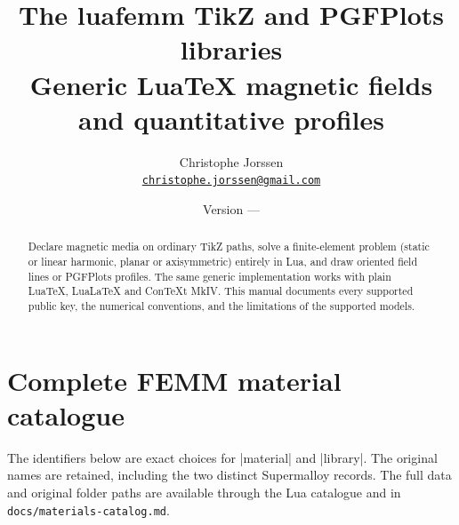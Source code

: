 \documentclass[a4paper,11pt]{ltxdoc}
\title{The \textsf{luafemm} TikZ and PGFPlots libraries\\
  \large Generic LuaTeX magnetic fields and quantitative profiles}
\author{Christophe Jorssen\\
  \normalsize\href{mailto:christophe.jorssen@gmail.com}{\nolinkurl{christophe.jorssen@gmail.com}}}
\date{Version \luafemmversion\quad---\quad\luafemmversiondate}
\begin{document}
\maketitle
\begin{abstract}
Declare magnetic media on ordinary TikZ paths, solve a finite-element
problem (static or linear harmonic, planar or axisymmetric) entirely in Lua, and draw oriented field lines or PGFPlots profiles.
The same generic implementation works with plain LuaTeX, LuaLaTeX and
ConTeXt MkIV. This manual documents every supported public key, the numerical
conventions, and the limitations of the supported models.
\end{abstract}

\clearpage
\tableofcontents
\clearpage





























\appendix

\section{Complete FEMM material catalogue}
\label{sec:catalogue}
The identifiers below are exact choices for |material| and |library|.
The original names are retained, including the two distinct Supermalloy
records. The full data and original folder paths are available through
the Lua catalogue and in \texttt{docs/materials-catalog.md}.

\clearpage
\printindex
\end{document}
